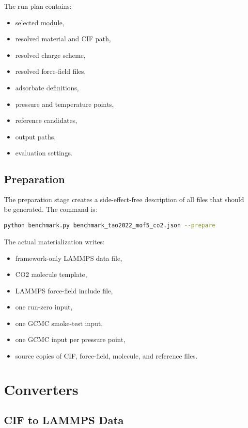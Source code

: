 \documentclass[11pt,a4paper]{article}
\begin{document}
The run plan contains:

\begin{itemize}
    \item selected module,
    \item resolved material and CIF path,
    \item resolved charge scheme,
    \item resolved force-field files,
    \item adsorbate definitions,
    \item pressure and temperature points,
    \item reference candidates,
    \item output paths,
    \item evaluation settings.
\end{itemize}

\subsection{Preparation}

The preparation stage creates a side-effect-free description of all files that should be generated.
The command is:

\begin{lstlisting}[language=bash]
python benchmark.py benchmark_tao2022_mof5_co2.json --prepare
\end{lstlisting}

The actual materialization writes:

\begin{itemize}
    \item framework-only LAMMPS data file,
    \item CO2 molecule template,
    \item LAMMPS force-field include file,
    \item one run-zero input,
    \item one GCMC smoke-test input,
    \item one GCMC input per pressure point,
    \item source copies of CIF, force-field, molecule, and reference files.
\end{itemize}

\section{Converters}

\subsection{CIF to LAMMPS Data}
\end{document}
